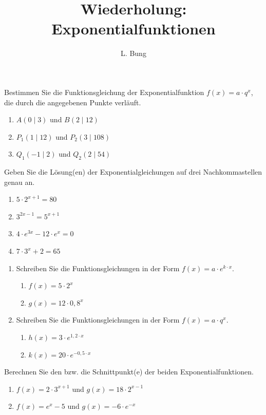 \documentclass[11pt, a4paper, oneside]{article}
\begin{document}
	\author{L. Bung}
	\title{Wiederholung: Exponentialfunktionen}
	\subject{Mathematik}
	\maketitle
	
	
	Bestimmen Sie die Funktionsgleichung der Exponentialfunktion $f(x) = a \cdot q^x$, die durch die angegebenen Punkte verläuft.
	
	\begin{enumerate}[label=\alph*)]
		\item $A(0 \mid 3)$ und $B(2 \mid 12)$
		\item $P_1(1 \mid 12)$ und $P_2(3 \mid 108)$
		\item $Q_1(-1 \mid 2)$ und $Q_2(2 \mid 54)$
	\end{enumerate}
	
	
	
	Geben Sie die Lösung(en) der Exponentialgleichungen auf drei Nachkommastellen genau an.
	
	\begin{enumerate}[label=\alph*)]
		\item $5 \cdot 2^{x+1} = 80$
		\item $3^{2x-1} = 5^{x+1}$
		\item $4 \cdot e^{3x} - 12 \cdot e^{x} = 0$
		\item $7 \cdot 3^{x} + 2 = 65$
	\end{enumerate}
	
	
	
	\begin{enumerate}[label=\alph*)]
		\item Schreiben Sie die Funktionsgleichungen in der Form $f(x) = a \cdot e^{k \cdot x}$.
		\begin{enumerate}[label=\roman*)]
			\item $f(x) = 5 \cdot 2^x$
			\item $g(x) = 12 \cdot 0{,}8^x$
		\end{enumerate}
		
		\item Schreiben Sie die Funktionsgleichungen in der Form $f(x) = a \cdot q^x$.
		\begin{enumerate}[label=\roman*)]
			\item $h(x) = 3 \cdot e^{1{,}2 \cdot x}$
			\item $k(x) = 20 \cdot e^{-0{,}5 \cdot x}$
		\end{enumerate}
	\end{enumerate}
	
	
	
	Berechnen Sie den bzw. die Schnittpunkt(e) der beiden Exponentialfunktionen.
	\begin{enumerate}[label=\alph*)]
		\item $f(x) = 2 \cdot 3^{x+1}$ und $g(x) = 18 \cdot 2^{x-1}$
		\item $f(x) = e^x - 5$ und $g(x) = -6 \cdot e^{-x}$
	\end{enumerate}
	
\end{document}
